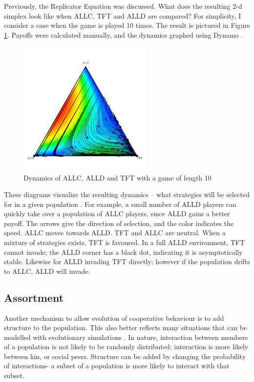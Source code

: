 \documentclass[a4paper,11pt,bcshonoursthesis,singlespace,oneside,thesisdraft,pdflatex]{cssethesis}
\begin{document}
Previously, the Replicator Equation was discussed. 
What does the resulting 2-d simplex look like when ALLC, TFT and ALLD are compared? 
For simplicity, I consider a case when the game is played 10 times. 
The result is pictured in Figure \ref{fig:allcalldtft}. 
Payoffs were calculated manually, and the dynamics graphed using Dynamo \citep{dynamo}.

\begin{figure}[h!]
\center
\includegraphics[width=0.6\textwidth]{allcalldtft}
\caption{Dynamics of ALLC, ALLD and TFT with a game of length 10}
\label{fig:allcalldtft}
\end{figure}
 
These diagrams visualize the resulting dynamics -- what strategies will be selected for in a given population \citep{imhof:PNAS:2005}. 
For example, a small number of ALLD players can quickly take over a population of ALLC players, since ALLD gains a better payoff. The arrows give the direction of selection, and the color indicates the speed.  ALLC moves towards ALLD. 
TFT and ALLC are neutral. 
When a mixture of strategies exists, TFT is favoured. 
In a full ALLD environment, TFT cannot invade; the ALLD corner has a black dot, indicating it is asymptotically stable. 
Likewise for ALLD invading TFT directly; however if the population drifts to ALLC, ALLD will invade. 

\subsection{Assortment}
Another mechanism to allow evolution of cooperative behaviour is to add structure to the population. 
This also better reflects many situations that can be modelled with evolutionary simulations \citep{eshel:PNAS:1982}. 
In nature, interaction between members of a population is not likely to be randomly distributed; interaction is more likely between kin, or social peers. 
Structure can be added by changing the probability of interactions- a subset of a population is more likely to interact with that subset. 
\end{document}
